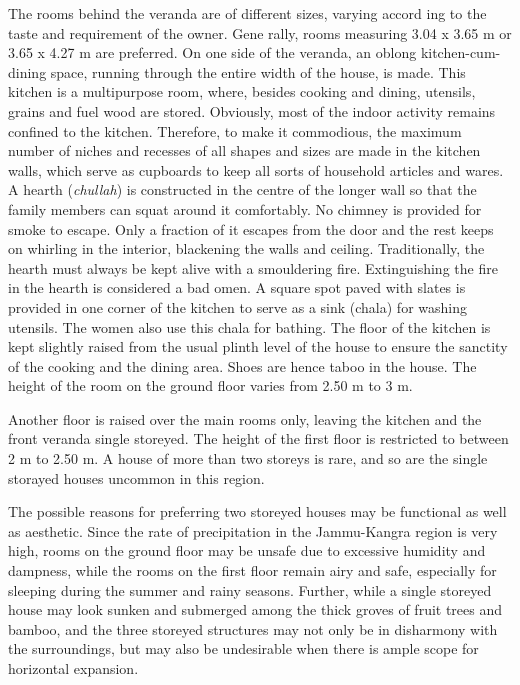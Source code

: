 The rooms behind the veranda are of different sizes, varying accord ing to the taste and requirement of the owner. Gene rally, rooms measuring 3.04 x 3.65 m or 3.65 x 4.27 m are preferred. On one side of the veranda, an oblong kitchen-cum-dining space, running through the entire width of the house, is made. This kitchen is a multipurpose room, where, besides cooking and dining, utensils, grains and fuel wood are stored. Obviously, most of the indoor activity remains confined to the kitchen. Therefore, to make it commodious, the maximum number of niches and recesses of all shapes and sizes are made in the kitchen walls, which serve as cupboards to keep all sorts of household articles and wares. A hearth (\textit{chullah}) is constructed in the centre of the longer wall so that the family members can squat around it comfortably. No chimney is provided for smoke to escape. Only a fraction of it escapes from the door and the rest keeps on whirling in the interior, blackening the walls and ceiling. Traditionally, the hearth must always be kept alive with a smouldering fire. Extinguishing the fire in the hearth is considered a bad omen. A square spot paved with slates is provided in one corner of the kitchen to serve as a sink (chala) for washing utensils. The women also use this chala for bathing. The floor of the kitchen is kept slightly raised from the usual plinth level of the house to ensure the sanctity of the cooking and the dining area. Shoes are hence taboo in the house. The height of the room on the ground floor varies from 2.50 m to 3 m.

Another floor is raised over the main rooms only, leaving the kitchen and the front veranda single storeyed. The height of the first floor is restricted to between 2 m to 2.50 m. A house of more than two storeys is rare, and so are the single storayed houses uncommon in this region.

The possible reasons for preferring two storeyed houses may be functional as well as aesthetic. Since the rate of precipitation in the Jammu-Kangra region is very high, rooms on the ground floor may be unsafe due to excessive humidity and dampness, while the rooms on the first floor remain airy and safe, especially for sleeping during the summer and rainy seasons. Further, while a single storeyed house may look sunken and submerged among the thick groves of fruit trees and bamboo, and the three storeyed structures may not only be in disharmony with the surroundings, but may also be undesirable when there is ample scope for horizontal expansion.

